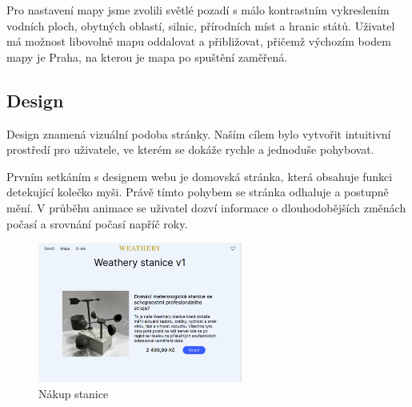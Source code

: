 Pro nastavení mapy jsme zvolili světlé pozadí s málo kontrastním vykreslením vodních ploch, obytných oblastí, silnic, přírodních míst a hranic států. Uživatel má možnost libovolně mapu oddalovat a přibližovat, přičemž výchozím bodem mapy je Praha, na kterou je mapa po spuštění zaměřená.

\subsection{Design}
Design znamená vizuální podoba stránky.
Naším cílem bylo vytvořit intuitivní prostředí pro uživatele, ve kterém se dokáže rychle a jednoduše pohybovat.

Prvním setkáním s designem webu je domovská stránka, která obsahuje funkci detekující kolečko myši.
Právě tímto pohybem se stránka odhaluje a postupně mění. V průběhu animace se uživatel dozví informace o dlouhodobějších změnách počasí a srovnání počasí napříč roky.

\newpage
\begin{figure}[h] %
    \centering
    \includegraphics[width=0.6\textwidth]{images/nakup.png}
    \caption{Nákup stanice}
    \label{nakup}
\end{figure}
